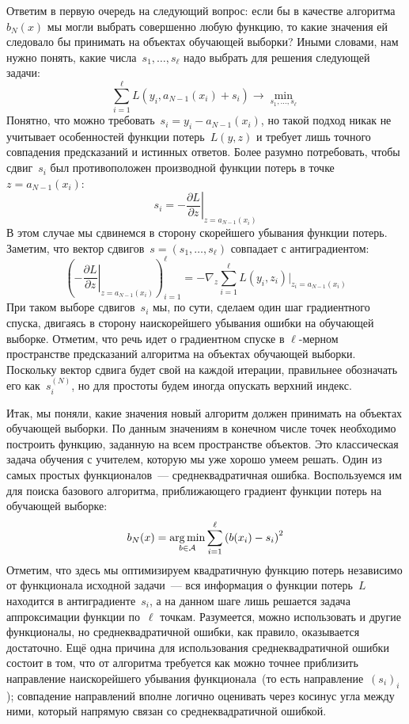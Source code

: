 \documentclass[12pt,fleqn]{article}
\begin{document}
Ответим в первую очередь на следующий вопрос: если бы в качестве алгоритма~$b_N(x)$ мы
могли выбрать совершенно любую функцию, то какие значения ей следовало бы принимать
на объектах обучающей выборки? Иными словами, нам нужно понять, какие числа~$s_1, \dots, s_\ell$
надо выбрать для решения следующей задачи:
\[
    \sum_{i = 1}^{\ell}
        L(y_i, a_{N - 1}(x_i) + s_i)
    \to
    \min_{s_1, \dots, s_\ell}
\]
Понятно, что можно требовать~$s_i = y_i - a_{N - 1}(x_i)$,
но такой подход никак не учитывает особенностей функции потерь~$L(y, z)$
и требует лишь точного совпадения предсказаний и истинных ответов.
Более разумно потребовать, чтобы сдвиг~$s_i$ был противоположен производной функции потерь
в точке~$z = a_{N - 1}(x_i)$:
\[
    s_i
    =
    -
    \left.
    \frac{\partial L}{\partial z}
    \right|_{z = a_{N - 1}(x_i)}
\]
В этом случае мы сдвинемся в сторону скорейшего убывания функции потерь.
Заметим, что вектор сдвигов~$s = (s_1, \dots, s_\ell)$ совпадает
с антиградиентом:
\[
    \left(
        -\left.
        \frac{\partial L}{\partial z}
        \right|_{z = a_{N - 1}(x_i)}
    \right)_{i = 1}^{\ell}
    =
    -\nabla_z
    \sum_{i = 1}^{\ell}
        L(y_i, z_i)
    \big|_{z_i = a_{N - 1}(x_i)}
\]
При таком выборе сдвигов~$s_i$ мы, по сути, сделаем один шаг градиентного спуска,
двигаясь в сторону наискорейшего убывания ошибки на обучающей выборке.
Отметим, что речь идет о градиентном спуске в $\ell$-мерном пространстве предсказаний алгоритма
на объектах обучающей выборки.
Поскольку вектор сдвига будет свой на каждой итерации, правильнее обозначать его как~$s_i^{(N)}$,
но для простоты будем иногда опускать верхний индекс.

Итак, мы поняли, какие значения новый алгоритм должен принимать на объектах обучающей выборки.
По данным значениям в конечном числе точек необходимо построить функцию, заданную на всем
пространстве объектов.
Это классическая задача обучения с учителем, которую мы уже хорошо умеем решать.
Один из самых простых функционалов~--- среднеквадратичная ошибка.
Воспользуемся им для поиска базового алгоритма, приближающего градиент функции потерь на обучающей выборке:
\[
    b_N(x)
    =
    \mathop{\rm arg\,min}\limits_{b \in \mathcal{A}}
        \sum_{i = 1}^{\ell}
            \left(
                b(x_i) - s_i
            \right)^2
\]
Отметим, что здесь мы оптимизируем квадратичную функцию потерь
независимо от функционала исходной задачи~--- вся информация о функции потерь~$L$
находится в антиградиенте~$s_i$,
а на данном шаге лишь решается задача аппроксимации функции по~$\ell$ точкам.
Разумеется, можно использовать и другие функционалы, но среднеквадратичной ошибки,
как правило, оказывается достаточно.
Ещё одна причина для использования среднеквадратичной ошибки состоит в том,
что от алгоритма требуется как можно точнее приблизить направление
наискорейшего убывания функционала~(то есть направление~$(s_i)_i$);
совпадение направлений вполне логично оценивать через косинус угла между ними,
который напрямую связан со среднеквадратичной ошибкой.
\end{document}
